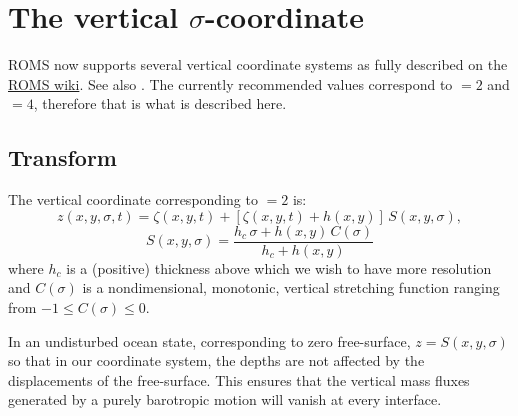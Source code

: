 \section{The vertical $\sigma$-coordinate}
\label{Scoord}

ROMS now supports several vertical coordinate systems as fully
described on the
\href{https://www.myroms.org/wiki/index.php/Vertical_S-coordinate}{ROMS
wiki}. See also \citet{SS2005}. The
currently recommended values correspond to $=2$
and $=4$, therefore that is what is described here.

\subsection{Transform}
The vertical coordinate corresponding to $=2$ is:
\begin{equation}
     z(x,y,\sigma,t) = \zeta(x,y,t) + \left[\zeta(x,y,t) +
     h(x,y)\right] \, S(x,y,\sigma),
\end{equation}
\begin{equation}
     S(x,y,\sigma) = \frac{h_c \, \sigma + h(x,y)\,
          C(\sigma)}{h_c + h(x,y)}
\end{equation}
where $h_c$ is a (positive) thickness above
which we wish to have more resolution and $C(\sigma)$ is a
nondimensional, monotonic, vertical
stretching function ranging from $-1 \le C(\sigma) \le 0$.

In an undisturbed ocean state, corresponding to zero free-surface,
$z=S(x,y,\sigma)$ so that in our coordinate system, the depths are not
affected by the displacements of the free-surface.  This ensures that
the vertical mass fluxes generated by a purely barotropic motion will
vanish at every interface.


